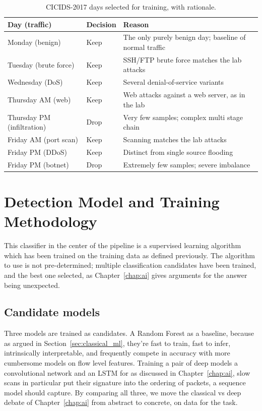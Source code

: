 \begin{table}[H]
  \centering
  \caption{CICIDS-2017 days selected for training, with rationale.}
  \label{tab:dataset_days}
  \renewcommand{\arraystretch}{1.3}
  \begin{tabularx}{\textwidth}{llX}
    \toprule
    \textbf{Day (traffic)} & \textbf{Decision} & \textbf{Reason} \\
    \midrule
    Monday (benign)          & Keep & The only purely benign day; baseline of normal traffic \\
    Tuesday (brute force)    & Keep & SSH/FTP brute force matches the lab attacks \\
    Wednesday (DoS)          & Keep & Several denial-of-service variants \\
    Thursday AM (web)        & Keep & Web attacks against a web server, as in the lab \\
    Thursday PM (infiltration) & Drop & Very few samples; complex multi stage chain \\
    Friday AM (port scan)    & Keep & Scanning matches the lab attacks \\
    Friday PM (DDoS)         & Keep & Distinct from single source flooding \\
    Friday PM (botnet)       & Drop & Extremely few samples; severe imbalance \\
    \bottomrule
  \end{tabularx}
\end{table}

\section{Detection Model and Training Methodology}
\label{sec:conception_training}

This classifier in the center of the pipeline is a supervised learning algorithm which has been trained on the training data as defined previously. The algorithm to use is not pre-determined; multiple classification candidates have been trained, and the best one selected, as Chapter~\ref{chap:ai} gives arguments for the answer being unexpected.

\subsection{Candidate models}
\label{sec:conception_candidates}

Three models are trained as candidates. A Random Forest as a baseline, because as argued in Section~\ref{sec:classical_ml}, they're fast to train, fast to infer, intrinsically interpretable, and frequently compete in accuracy with more cumbersome models on flow level features. Training a pair of deep models   a convolutional network and an LSTM   for as discussed in Chapter~\ref{chap:ai}, slow scans in particular put their signature into the ordering of packets, a sequence model should capture. By comparing all three, we move the classical vs deep debate of Chapter~\ref{chap:ai} from abstract to concrete, on data for the task.

